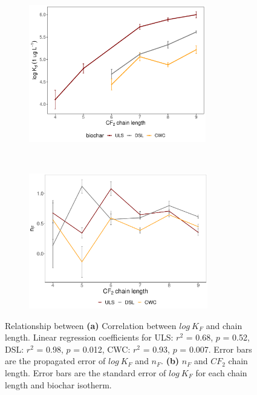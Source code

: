 \begin{figure}[t!]
    \centering
    \begin{subfigure}[t]{0.5\textwidth}
        \centering
        \includegraphics[height=6cm]{R/figs/Kd_1ugL_plot.pdf}
        \caption{}
        \label{subfig:chainlength}
    \end{subfigure}%
    ~ 
    \begin{subfigure}[t]{0.5\textwidth}
        \centering
        \includegraphics[height=5.9cm]{R/figs/n_KF.pdf}
        \caption{}
        \label{subfig:n}
    \end{subfigure}
    \label{fig:chain_length_n}
    \caption{Relationship between \textbf{(a)} Correlation between $log~K_F$ and chain length. Linear regression coefficients for ULS: $r^2$ = 0.68, $p$ = 0.52, DSL: $r^2$ = 0.98, $p$ = 0.012, CWC: $r^2$ = 0.93, $p$ = 0.007. Error bars are the propagated error of $log~K_F$ and $n_F$. \textbf{(b)} $n_F$ and $CF_2$ chain length. Error bars are the standard error of $log~K_F$ for each chain length and biochar isotherm.}
\end{figure}

